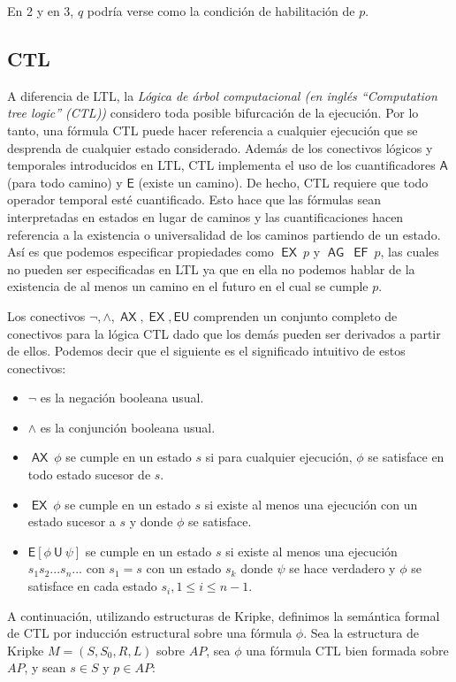 \documentclass[pdftex,a4paper,12pt]{book}
\newcommand{\U}{\mathbin{\textsf{U}}}
\newcommand{\A}{\mathbin{\textsf{A}}}
\newcommand{\E}{\mathbin{\textsf{E}}}
\newcommand{\AX}{\mathop{\mathsf{AX}}}
\newcommand{\AG}{\mathop{\mathsf{AG}}}
\newcommand{\EX}{\mathop{\mathsf{EX}}}
\newcommand{\EF}{\mathop{\mathsf{EF}}}
\begin{document}
En 2 y en 3, $q$ podr\'ia verse como la condici\'on de habilitaci\'on de $p$.

\subsection*{CTL}
A diferencia de LTL, la \textit{L\'ogica de \'arbol computacional (en ingl\'es ``Computation tree logic'' (CTL))} considero toda posible bifurcaci\'on de la ejecuci\'on. Por lo tanto, una f\'ormula CTL puede hacer referencia a cualquier ejecuci\'on que se desprenda de cualquier estado considerado. Adem\'as de los conectivos l\'ogicos y temporales introducidos en LTL, CTL implementa el uso de los cuantificadores $\A$ (para todo camino) y $\E$ (existe un camino). De hecho, CTL requiere que todo operador temporal est\'e cuantificado. Esto hace que las f\'ormulas sean interpretadas en estados en lugar de caminos y las cuantificaciones hacen referencia a la existencia o universalidad de los caminos partiendo de un estado. As\'i es que podemos especificar propiedades como  $\EX~p$ y $\AG~\EF~p$, las cuales no pueden ser especificadas en LTL ya que en ella no podemos hablar de la existencia de al menos un camino en el futuro en el cual se cumple $p$.

Los conectivos ${\neg,\wedge,\AX,\EX,\E\U}$ comprenden un conjunto completo de conectivos para la l\'ogica CTL dado que los dem\'as pueden ser derivados a partir de ellos. Podemos decir que el siguiente es el significado intuitivo de estos conectivos:

\begin{itemize}
\item $\neg$ es la negaci\'on booleana usual.
\item $\wedge$ es la conjunci\'on booleana usual.
\item $\AX~\phi$ se cumple en un estado $s$ si para cualquier ejecuci\'on, $\phi$ se satisface en todo estado sucesor de $s$.
\item $\EX~\phi $ se cumple en un estado $s$ si existe al menos una ejecuci\'on con un estado sucesor a $s$ y donde $\phi$ se satisface.
\item $\E[\phi~\U~\psi]$ se cumple en un estado $s$ si existe al menos una ejecuci\'on $s_1s_2...s_n...$ con $s_1 = s$ con un estado $s_k$ donde $\psi$ se hace verdadero y $\phi$ se satisface en cada estado $s_i, 1 \leq i \leq n-1$.
\end{itemize}

A continuaci\'on, utilizando estructuras de Kripke, definimos la sem\'antica formal de CTL por inducci\'on estructural sobre una f\'ormula $\phi$. Sea la estructura de Kripke $M =(S,S_0,R,L)$ sobre $AP$, sea $\phi$ una f\'ormula CTL bien formada sobre $AP$, y sean $s \in S$ y $p \in AP$:\\
\end{document}
